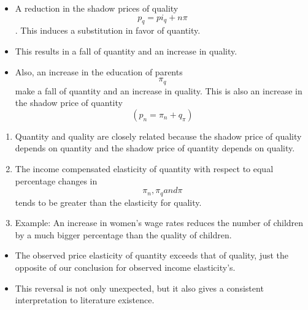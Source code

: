\documentclass{beamer}
\begin{document}

\begin{frame}
\begin{itemize}
    \item A reduction in the shadow prices of quality $$p_q=pi_q+n\pi$$. This induces a substitution in favor of quantity.
    \item This results in a \alert{fall of quantity} and an \alert{increase in quality}.
    \item Also, an increase in the education of parents $$\pi_q$$ make a \alert{fall of quantity} and an \alert{increase in quality}. This is also an increase in the shadow price of quantity $$(p_n=\pi_n+q_\pi)$$
\end{itemize}
\end{frame}

\begin{frame}
\begin{enumerate}
    \item Quantity and quality are closely related  because the shadow price of quality depends on quantity and the shadow price of quantity depends on quality.
    \item The income compensated elasticity of quantity with respect to equal percentage changes in $$\pi_n, \pi_q and\pi$$ tends to be greater than the elasticity for quality.
    \item \alert{Example}: An increase in women's  wage rates reduces the number of children by a much bigger percentage than the quality of children. 
\end{enumerate}
\end{frame}

\begin{frame}
\begin{itemize}
    \item The observed price elasticity of quantity exceeds that of quality, just the opposite of our conclusion for observed income elasticity's.
    \item This reversal is not only unexpected, but it also gives a consistent interpretation to literature existence.  
\end{itemize}
\end{frame}
\end{document}

